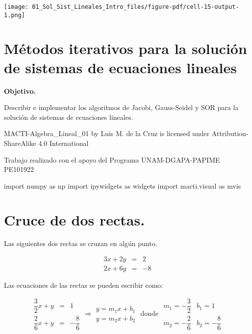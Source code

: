 \documentclass[
  letterpaper,
  DIV=11,
  numbers=noendperiod]{scrreprt}
\newenvironment{Shaded}{\begin{snugshade}}{\end{snugshade}}
\newcommand{\ImportTok}[1]{\textcolor[rgb]{0.00,0.46,0.62}{#1}}
\newcommand{\NormalTok}[1]{\textcolor[rgb]{0.00,0.23,0.31}{#1}}
\begin{document}
\texttt{[image: 01\_Sol\_Sist\_Lineales\_Intro\_files/figure-pdf/cell-15-output-1.png]}


\chapter{Métodos iterativos para la solución de sistemas de ecuaciones
lineales}\label{muxe9todos-iterativos-para-la-soluciuxf3n-de-sistemas-de-ecuaciones-lineales}

\textbf{Objetivo.}

Describir e implementar los algoritmos de Jacobi, Gauss-Seidel y SOR
para la solución de sistemas de ecuaciones lineales.

MACTI-Algebra\_Lineal\_01 by Luis M. de la Cruz is licensed under
Attribution-ShareAlike 4.0 International

Trabajo realizado con el apoyo del Programa UNAM-DGAPA-PAPIME PE101922

\begin{Shaded}
\begin{Highlighting}[]
\ImportTok{import}\NormalTok{ numpy }\ImportTok{as}\NormalTok{ np}
\ImportTok{import}\NormalTok{ ipywidgets }\ImportTok{as}\NormalTok{ widgets}
\ImportTok{import}\NormalTok{ macti.visual }\ImportTok{as}\NormalTok{ mvis}
\end{Highlighting}
\end{Shaded}


\chapter{Cruce de dos rectas.}\label{cruce-de-dos-rectas.}

Las siguientes dos rectas se cruzan en algún punto.

\[
\begin{array}{ccc}
3x + 2y & = &2 \\
2x + 6y & = &-8
\end{array}
\]

Las ecuaciones de las rectas se pueden escribir como:

\[
\begin{array}{ccc}
\dfrac{3}{2}x + y & = & 1 \\
\dfrac{2}{6}x + y & = & -\dfrac{8}{6}
\end{array} \Longrightarrow
\begin{array}{ccc}
y = m_1 x + b_1 \\
y = m_2 x + b_2
\end{array} \text{ donde }
\begin{array}{ccc}
m_1 = -\dfrac{3}{2} & b_1 = 1 \\
m_2 = -\dfrac{2}{6} & b_2 = -\dfrac{8}{6}
\end{array}
\]
\end{document}
